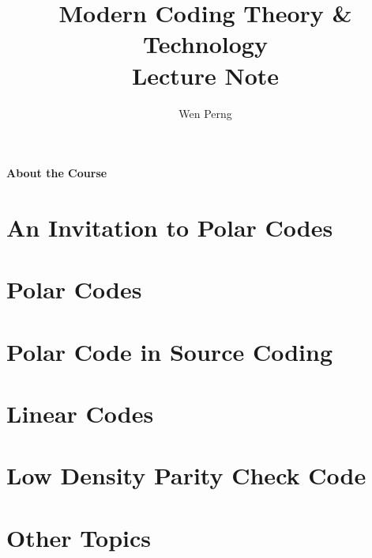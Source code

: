 \documentclass{lectureNotes}
\begin{document}
\begin{titlepage}
    \title{Modern Coding Theory \& Technology \\Lecture Note}
    \author{Wen Perng}
    \maketitle
\end{titlepage}

\setcounter{page}{1}
\begin{center}
    {\Large\textbf{About the Course}}
\end{center}

\newpage

\setcounter{tocdepth}{1}
\tableofcontents

\chapter{An Invitation to Polar Codes}

\chapter{Polar Codes}



\chapter{Polar Code in Source Coding}



\chapter{Linear Codes}




\chapter{Low Density Parity Check Code}


\chapter{Other Topics}









\end{document}
